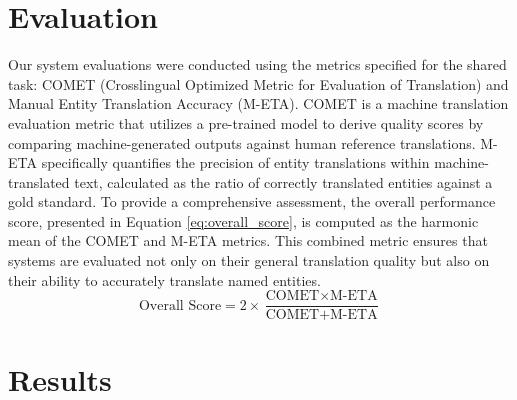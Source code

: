 \documentclass[final]{ecai}
\begin{document}
\section{Evaluation}
\label{sec:experiments}
Our system evaluations were conducted using the metrics specified for the shared task: COMET 
(Crosslingual Optimized Metric for Evaluation of Translation)\cite{rei-etal-2020-comet} and 
Manual Entity Translation Accuracy (M-ETA). 
COMET is a machine translation evaluation metric that utilizes a pre-trained model to derive 
quality scores by comparing machine-generated outputs against human reference translations. 
M-ETA specifically quantifies the precision of entity translations within machine-translated text, 
calculated as the ratio of correctly translated entities against a gold standard.
To provide a comprehensive assessment, the overall performance score, presented in Equation \ref{eq:overall_score}, 
is computed as the harmonic mean of the COMET and M-ETA metrics. This combined metric ensures that systems are 
evaluated not only on their general translation quality but also on their ability to accurately translate named entities.
\begin{equation}
\label{eq:overall_score}
\text{Overall Score} = 2 \times \frac{\text{COMET} \times \text{M-ETA}}{\text{COMET} + \text{M-ETA}}
\end{equation}

\section{Results}
\label{eq:results}
\end{document}

